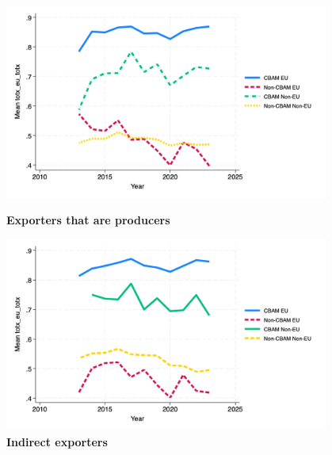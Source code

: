 \documentclass{article}
\begin{document}
\begin{figure}[H]
\centering
\includegraphics[width=0.95\textwidth]{totx_eu_totx_ep.png}
\caption{\textbf{Exporters that are producers}}
\includegraphics[width=0.95\textwidth]{totx_eu_totx_indir.png}
\caption{\textbf{Indirect exporters}}
\end{figure}
\end{document}
